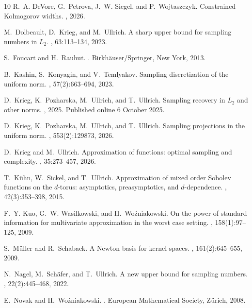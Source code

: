 \documentclass[11pt,reqno, a4paper]{article}
\numberwithin{equation}{section}
\begin{document}
\begin{thebibliography}{10}
R.~A. DeVore, G.~Petrova, J.~W. Siegel, and P.~Wojtaszczyk.
\newblock Constrained {Kolmogorov} widths.
, 2026.

M.~Dolbeault, D.~Krieg, and M.~Ullrich.
\newblock A sharp upper bound for sampling numbers in {$L_2$}.
, 63:113--134, 2023.

S.~Foucart and H.~Rauhut.
.
\newblock Birkh\"auser/Springer, New York, 2013.

B.~Kashin, S.~Konyagin, and V.~Temlyakov.
\newblock Sampling discretization of the uniform norm.
, 57(2):663--694, 2023.

D.~Krieg, K.~Pozharska, M.~Ullrich, and T.~Ullrich.
\newblock Sampling recovery in {$L_2$} and other norms.
, 2025.
\newblock Published online 6 October 2025.

D.~Krieg, K.~Pozharska, M.~Ullrich, and T.~Ullrich.
\newblock Sampling projections in the uniform norm.
,
  553(2):129873, 2026.

D.~Krieg and M.~Ullrich.
\newblock Approximation of functions: optimal sampling and complexity.
, 35:273--457, 2026.

T.~K\"{u}hn, W.~Sickel, and T.~Ullrich.
\newblock Approximation of mixed order {S}obolev functions on the {$d$}-torus:
  asymptotics, preasymptotics, and {$d$}-dependence.
, 42(3):353--398, 2015.

F.~Y. Kuo, G.~W. Wasilkowski, and H.~Wo\'zniakowski.
\newblock On the power of standard information for multivariate approximation
  in the worst case setting.
, 158(1):97--125, 2009.

S.~M\"uller and R.~Schaback.
\newblock A {Newton} basis for kernel spaces.
, 161(2):645--655, 2009.

N.~Nagel, M.~Sch\"{a}fer, and T.~Ullrich.
\newblock A new upper bound for sampling numbers.
, 22(2):445--468, 2022.

E.~Novak and H.~Wo\'zniakowski.
.
\newblock European Mathematical Society, Z\"urich, 2008.


\end{thebibliography}
\end{document}
